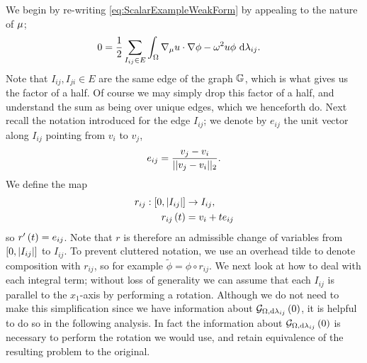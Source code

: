 We begin by re-writing \eqref{eq:ScalarExampleWeakForm} by appealing to the nature of $\mu$;
\begin{align} \label{eq:ScalarExampleSumOfInts}
	0 &= \frac{1}{2}\sum_{I_{ij}\in E}\int_{\Omega}\nabla_\mu u \cdot \nabla\phi - \omega^2 u\phi \ \mathrm{d}\lambda_{ij}.
\end{align}
Note that $I_{ij},I_{ji}\in E$ are the same edge of the graph $\mathbb{G}$, which is what gives us the factor of a half.
Of course we may simply drop this factor of a half, and understand the sum as being over unique edges, which we henceforth do.
Next recall the notation introduced for the edge $I_{ij}$; we denote by $e_{ij}$ the unit vector along $I_{ij}$ pointing from $v_i$ to $v_j$,
\begin{align*}
	e_{ij} = \frac{v_j-v_i}{\lvert\lvert v_j-v_i \rvert\rvert_2}.
\end{align*}
We define the map 
\begin{align*}
	r_{ij}:\left[ 0,\lvert I_{ij} \rvert \right] &\rightarrow I_{ij}, \\
	r_{ij}\left( t \right) &= v_i + te_{ij}
\end{align*}
so $r'\left( t \right)=e_{ij}$.
Note that $r$ is therefore an admissible change of variables from $\left[ 0,\lvert I_{ij} \rvert \right]$ to $I_{ij}$.
To prevent cluttered notation, we use an overhead tilde to denote composition with $r_{ij}$, so for example $\tilde{\phi}=\phi\circ r_{ij}$.
We next look at how to deal with each integral term; without loss of generality we can assume that each $I_{ij}$ is parallel to the $x_1$-axis by performing a rotation.
Although we do not need to make this simplification since we have information about $\mathcal{G}_{ \Omega, \mathrm{d}\lambda_{ij}}\left( 0 \right)$, it is helpful to do so in the following analysis.
In fact the information about $\mathcal{G}_{ \Omega, \mathrm{d}\lambda_{ij}}\left( 0 \right)$ is necessary to perform the rotation we would use, and retain equivalence of the resulting problem to the original. \newline

